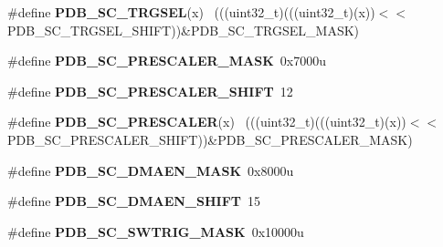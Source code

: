 \begin{DoxyCompactItemize}
\item 
\hypertarget{group___p_d_b___register___masks_ga98d3539755a69c5db59982f6afc95163}{}\#define {\bfseries P\+D\+B\+\_\+\+S\+C\+\_\+\+T\+R\+G\+S\+E\+L}(x)                                              ~(((uint32\+\_\+t)(((uint32\+\_\+t)(x))$<$$<$P\+D\+B\+\_\+\+S\+C\+\_\+\+T\+R\+G\+S\+E\+L\+\_\+\+S\+H\+I\+F\+T))\&P\+D\+B\+\_\+\+S\+C\+\_\+\+T\+R\+G\+S\+E\+L\+\_\+\+M\+A\+S\+K)\label{group___p_d_b___register___masks_ga98d3539755a69c5db59982f6afc95163}

\item 
\hypertarget{group___p_d_b___register___masks_ga53e475cc672b4e976c7dccc10fe64d74}{}\#define {\bfseries P\+D\+B\+\_\+\+S\+C\+\_\+\+P\+R\+E\+S\+C\+A\+L\+E\+R\+\_\+\+M\+A\+S\+K}~0x7000u\label{group___p_d_b___register___masks_ga53e475cc672b4e976c7dccc10fe64d74}

\item 
\hypertarget{group___p_d_b___register___masks_gae8062c54fb9d63becd95c6e34399b995}{}\#define {\bfseries P\+D\+B\+\_\+\+S\+C\+\_\+\+P\+R\+E\+S\+C\+A\+L\+E\+R\+\_\+\+S\+H\+I\+F\+T}~12\label{group___p_d_b___register___masks_gae8062c54fb9d63becd95c6e34399b995}

\item 
\hypertarget{group___p_d_b___register___masks_gaf3190aabecbfc96a055a28d244939052}{}\#define {\bfseries P\+D\+B\+\_\+\+S\+C\+\_\+\+P\+R\+E\+S\+C\+A\+L\+E\+R}(x)                                        ~(((uint32\+\_\+t)(((uint32\+\_\+t)(x))$<$$<$P\+D\+B\+\_\+\+S\+C\+\_\+\+P\+R\+E\+S\+C\+A\+L\+E\+R\+\_\+\+S\+H\+I\+F\+T))\&P\+D\+B\+\_\+\+S\+C\+\_\+\+P\+R\+E\+S\+C\+A\+L\+E\+R\+\_\+\+M\+A\+S\+K)\label{group___p_d_b___register___masks_gaf3190aabecbfc96a055a28d244939052}

\item 
\hypertarget{group___p_d_b___register___masks_gae2e04f313df4593c36890e463071fe5b}{}\#define {\bfseries P\+D\+B\+\_\+\+S\+C\+\_\+\+D\+M\+A\+E\+N\+\_\+\+M\+A\+S\+K}~0x8000u\label{group___p_d_b___register___masks_gae2e04f313df4593c36890e463071fe5b}

\item 
\hypertarget{group___p_d_b___register___masks_ga06b0f6651787dda98baf8953321b101b}{}\#define {\bfseries P\+D\+B\+\_\+\+S\+C\+\_\+\+D\+M\+A\+E\+N\+\_\+\+S\+H\+I\+F\+T}~15\label{group___p_d_b___register___masks_ga06b0f6651787dda98baf8953321b101b}

\item 
\hypertarget{group___p_d_b___register___masks_gaee37e4f669c308f1bfa17462ccbdc44b}{}\#define {\bfseries P\+D\+B\+\_\+\+S\+C\+\_\+\+S\+W\+T\+R\+I\+G\+\_\+\+M\+A\+S\+K}~0x10000u\label{group___p_d_b___register___masks_gaee37e4f669c308f1bfa17462ccbdc44b}


\end{DoxyCompactItemize}
